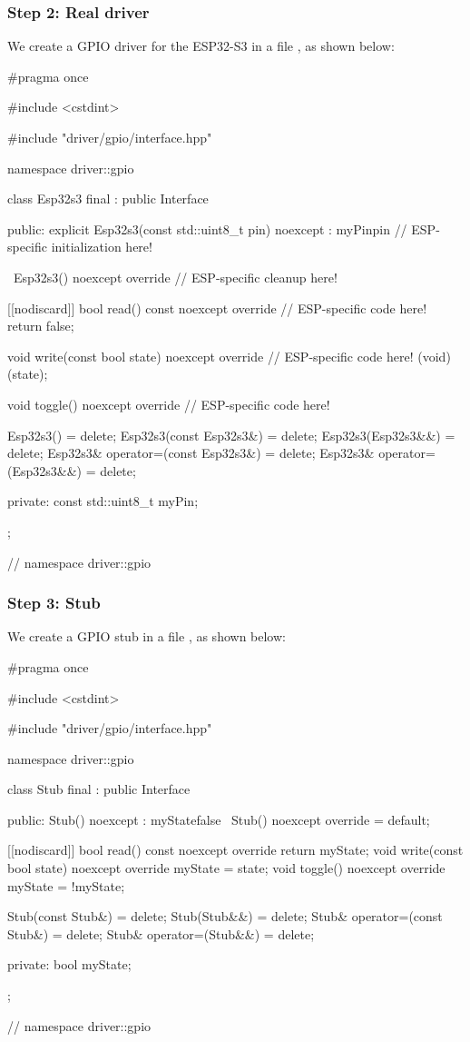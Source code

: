 \subsubsection{Step 2: Real driver}
We create a GPIO driver for the ESP32-S3 in a file , as shown below:

\begin{cppcode}
#pragma once

#include <cstdint>

#include "driver/gpio/interface.hpp"

namespace driver::gpio
{
class Esp32s3 final : public Interface
{
public:
    explicit Esp32s3(const std::uint8_t pin) noexcept
        : myPin{pin}
    {
        // ESP-specific initialization here!
    }

    ~Esp32s3() noexcept override
    {
        // ESP-specific cleanup here!
    }

    [[nodiscard]] bool read() const noexcept override
    {
        // ESP-specific code here!
        return false;
    }

    void write(const bool state) noexcept override
    {
        // ESP-specific code here!
        (void) (state);
    }

    void toggle() noexcept override
    {
        // ESP-specific code here!
    }

    Esp32s3()                          = delete;
    Esp32s3(const Esp32s3&)            = delete;
    Esp32s3(Esp32s3&&)                 = delete;
    Esp32s3& operator=(const Esp32s3&) = delete;
    Esp32s3& operator=(Esp32s3&&)      = delete;

private:
    const std::uint8_t myPin;
};
} // namespace driver::gpio
\end{cppcode}

\subsubsection{Step 3: Stub}
We create a GPIO stub in a file , as shown below:

\begin{cppcode}
#pragma once

#include <cstdint>

#include "driver/gpio/interface.hpp"

namespace driver::gpio
{
class Stub final : public Interface
{
public:
    Stub() noexcept
        : myState{false}
    {}
    ~Stub() noexcept override = default;

    [[nodiscard]] bool read() const noexcept override { return myState; }
    void write(const bool state) noexcept override { myState = state; }
    void toggle() noexcept override { myState = !myState; }

    Stub(const Stub&)            = delete;
    Stub(Stub&&)                 = delete;
    Stub& operator=(const Stub&) = delete;
    Stub& operator=(Stub&&)      = delete;

private:
    bool myState;
};
} // namespace driver::gpio
\end{cppcode}

